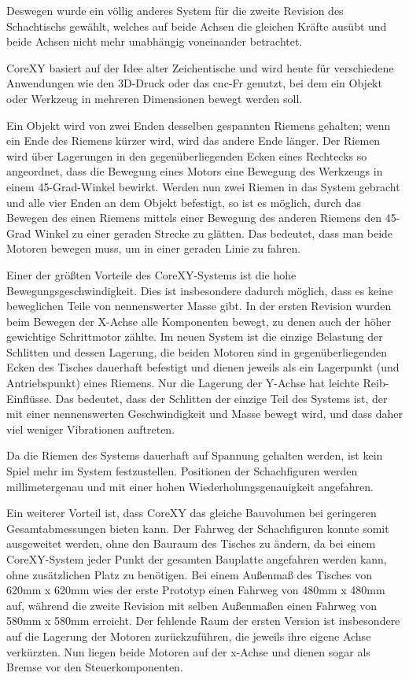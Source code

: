 Deswegen wurde ein völlig anderes System für die zweite Revision des
Schachtischs gewählt, welches auf beide Achsen die gleichen Kräfte
ausübt und beide Achsen nicht mehr unabhängig voneinander betrachtet.

CoreXY basiert auf der Idee alter Zeichentische und wird heute für
verschiedene Anwendungen wie den 3D-Druck oder das \gls{cnc}-Fr genutzt,
bei dem ein Objekt oder Werkzeug in mehreren Dimensionen bewegt werden
soll.

Ein Objekt wird von zwei Enden desselben gespannten Riemens gehalten;
wenn ein Ende des Riemens kürzer wird, wird das andere Ende länger. Der
Riemen wird über Lagerungen in den gegenüberliegenden Ecken eines
Rechtecks so angeordnet, dass die Bewegung eines Motors eine Bewegung
des Werkzeugs in einem 45-Grad-Winkel bewirkt. Werden nun zwei Riemen in
das System gebracht und alle vier Enden an dem Objekt befestigt, so ist
es möglich, durch das Bewegen des einen Riemens mittels einer Bewegung
des anderen Riemens den 45-Grad Winkel zu einer geraden Strecke zu
glätten. Das bedeutet, dass man beide Motoren bewegen muss, um in einer
geraden Linie zu fahren.

Einer der größten Vorteile des CoreXY-Systems ist die hohe
Bewegungsgeschwindigkeit. Dies ist insbesondere dadurch möglich, dass es
keine beweglichen Teile von nennenswerter Masse gibt. In der ersten
Revision wurden beim Bewegen der X-Achse alle Komponenten bewegt, zu
denen auch der höher gewichtige Schrittmotor zählte. Im neuen System ist
die einzige Belastung der Schlitten und dessen Lagerung, die beiden
Motoren sind in gegenüberliegenden Ecken des Tisches dauerhaft befestigt
und dienen jeweils als ein Lagerpunkt (und Antriebspunkt) eines Riemens.
Nur die Lagerung der Y-Achse hat leichte Reib-Einflüsse. Das bedeutet,
dass der Schlitten der einzige Teil des Systems ist, der mit einer
nennenswerten Geschwindigkeit und Masse bewegt wird, und dass daher viel
weniger Vibrationen auftreten.

Da die Riemen des Systems dauerhaft auf Spannung gehalten werden, ist
kein Spiel mehr im System festzustellen. Positionen der Schachfiguren
werden millimetergenau und mit einer hohen Wiederholungsgenauigkeit
angefahren.

Ein weiterer Vorteil ist, dass CoreXY das gleiche Bauvolumen bei
geringeren Gesamtabmessungen bieten kann. Der Fahrweg der Schachfiguren
konnte somit ausgeweitet werden, ohne den Bauraum des Tisches zu ändern,
da bei einem CoreXY-System jeder Punkt der gesamten Bauplatte angefahren
werden kann, ohne zusätzlichen Platz zu benötigen. Bei einem Außenmaß
des Tisches von 620mm x 620mm wies der erste Prototyp einen Fahrweg von
480mm x 480mm auf, während die zweite Revision mit selben Außenmaßen
einen Fahrweg von 580mm x 580mm erreicht. Der fehlende Raum der ersten
Version ist insbesondere auf die Lagerung der Motoren zurückzuführen,
die jeweils ihre eigene Achse verkürzten. Nun liegen beide Motoren auf
der x-Achse und dienen sogar als Bremse vor den Steuerkomponenten.

